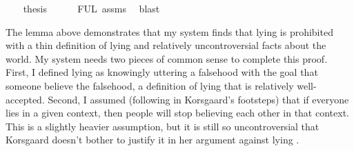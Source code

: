 \begin{isabellebody}
\ \ \isamarkupfalse%
\ {\isacharquery}thesis\isanewline
\ \ \ \ \isamarkupfalse%
\ FUL\ assms{\isacharparenleft}{}{\isacharparenright}\ \isamarkupfalse%
\ blast\ \isanewline
%
\isanewline
{}\isamarkupfalse%
%
\endisatagproof
{\isafoldproof}%
%
\isadelimproof
%
\endisadelimproof
%
\begin{isamarkuptext}%
The lemma above demonstrates that my system finds that lying is prohibited with a thin definition
of lying and relatively uncontroversial facts about the world. My system needs two pieces of common 
sense to complete this proof. First, I defined lying as knowingly uttering a falsehood with the goal 
that someone believe the falsehood, a definition of lying that is relatively well-accepted. Second, I 
assumed (following in Korsgaard's footsteps) that if 
everyone lies in a given context, then people will stop believing each other in that context. This is 
a slightly heavier assumption, but it is still so uncontroversial that Korsgaard doesn't bother to justify
it in her argument against lying \citep{KorsgaardRTL}. 


\end{isamarkuptext}
\end{isabellebody}
